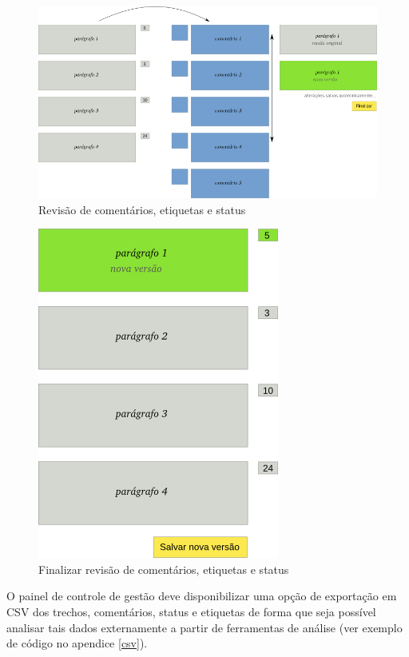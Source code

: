 \documentclass[12pt]{article}
\begin{document}
\begin{figure}[h!]
\center
\includegraphics[scale=0.3]{manage-comments.png}
\caption{Revisão de comentários, etiquetas e status}
\label{manage-comments}
\end{figure}

\begin{figure}[h!]
\center
\includegraphics[scale=0.3]{manage-comments-commit.png}
\caption{Finalizar revisão de comentários, etiquetas e status}
\label{manage-comments-commit}
\end{figure}

O painel de controle de gestão deve disponibilizar uma opção de exportação em
CSV dos trechos, comentários, status e etiquetas de forma que seja possível
analisar tais dados externamente a partir de ferramentas de análise (ver
exemplo de código no apendice \ref{csv}).
\end{document}
